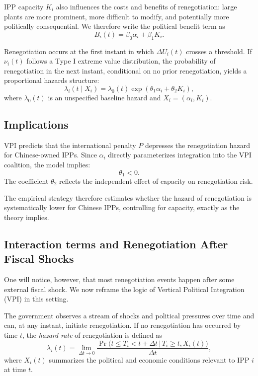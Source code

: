 \documentclass[12pt]{article}
\begin{document}
IPP capacity $K_i$ also influences the costs and benefits of renegotiation: large plants are more prominent, more difficult to modify, and potentially more politically consequential. We therefore write the political benefit term as
\[
B_i(t) = \beta_0\alpha_i + \beta_1 K_i.
\]

Renegotiation occurs at the first instant in which $\Delta U_i(t)$ crosses a threshold. If $\nu_i(t)$ follows a Type I extreme value distribution, the probability of renegotiation in the next instant, conditional on no prior renegotiation, yields a proportional hazards structure:
\[
\lambda_i(t \mid X_i) = \lambda_0(t)\exp\left(\theta_1 \alpha_i + \theta_2 K_i \right),
\]
where $\lambda_0(t)$ is an unspecified baseline hazard and $X_i = (\alpha_i, K_i)$.

\subsection*{Implications}

VPI predicts that the international penalty $P$ depresses the renegotiation hazard for Chinese-owned IPPs. Since $\alpha_i$ directly parameterizes integration into the VPI coalition, the model implies:
\[
\theta_1 < 0.
\]
The coefficient $\theta_2$ reflects the independent effect of capacity on renegotiation risk.

The empirical strategy therefore estimates whether the hazard of renegotiation is systematically lower for Chinese IPPs, controlling for capacity, exactly as the theory implies.

\subsection{Interaction terms and Renegotiation After Fiscal Shocks}

One will notice, however, that most renegotiation events happen after some external fiscal shock. We now reframe the logic of Vertical Political Integration (VPI) in this setting.

The government observes a stream of shocks and political pressures over time and can, at any instant, initiate renegotiation. If no renegotiation has occurred by time $t$, the \emph{hazard rate} of renegotiation is defined as
\[
  \lambda_i(t) 
  = \lim_{\Delta t \to 0} 
    \frac{\Pr\big( t \leq T_i < t + \Delta t \,\big|\, T_i \geq t, X_i(t) \big)}{\Delta t},
\]
where $X_i(t)$ summarizes the political and economic conditions relevant to IPP $i$ at time $t$.
\end{document}

